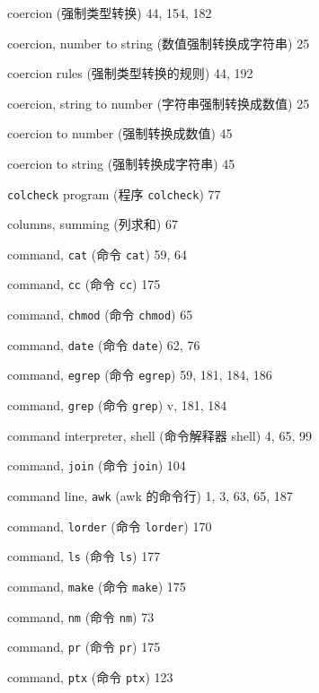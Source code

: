 \begin{multicols}{2}
\hangindent=2pc  coercion (强制类型转换) 44, 154, 182

\hangindent=2pc  coercion, number to string
(数值强制转换成字符串) 25

\hangindent=2pc  coercion rules (强制类型转换的规则) 44, 192

\hangindent=2pc  coercion, string to number
(字符串强制转换成数值) 25

\hangindent=2pc  coercion to number (强制转换成数值) 45

\hangindent=2pc  coercion to string (强制转换成字符串) 45

\hangindent=2pc  \verb'colcheck' program (程序 \verb'colcheck') 77

\hangindent=2pc  columns, summing (列求和) 67

\hangindent=2pc  command, \verb'cat' (命令 \verb'cat') 59, 64

\hangindent=2pc  command, \verb'cc' (命令 \verb'cc') 175

\hangindent=2pc  command, \verb'chmod' (命令 \verb'chmod') 65

\hangindent=2pc  command, \verb'date' (命令 \verb'date') 62, 76

\hangindent=2pc  command, \verb'egrep' (命令 \verb'egrep')
59, 181, 184,  186

\hangindent=2pc  command, \verb'grep' (命令 \verb'grep') v, 181, 184

\hangindent=2pc  command interpreter, shell (命令解释器 shell)
4, 65,  99

\hangindent=2pc  command, \verb'join' (命令 \verb'join') 104

\hangindent=2pc  command line, \verb'awk' (awk 的命令行) 1, 3, 63, 65, 187

\hangindent=2pc  command, \verb'lorder' (命令 \verb'lorder') 170

\hangindent=2pc  command, \verb'ls' (命令 \verb'ls') 177

\hangindent=2pc  command, \verb'make' (命令 \verb'make') 175

\hangindent=2pc  command, \verb'nm' (命令 \verb'nm') 73

\hangindent=2pc  command, \verb'pr' (命令 \verb'pr') 175

\hangindent=2pc  command, \verb'ptx' (命令 \verb'ptx') 123


\end{multicols}
